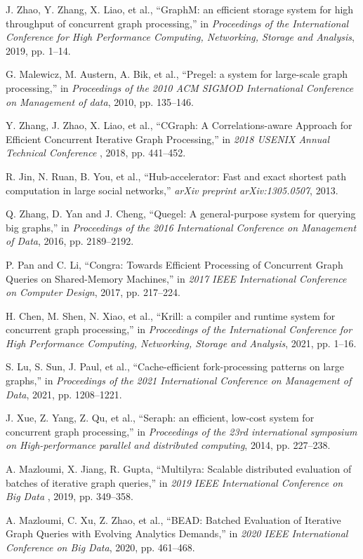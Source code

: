 \documentclass[lettersize,journal]{IEEEtran} %
\begin{document}
\begin{thebibliography}{100}
  J. Zhao, Y. Zhang, X. Liao, et al., ``GraphM: an efficient storage system for high throughput of concurrent graph processing,'' in \textit{Proceedings of the International Conference for High Performance Computing, Networking, Storage and Analysis}, 2019, pp. 1--14.
  
  G. Malewicz, M. Austern, A. Bik, et al., ``Pregel: a system for large-scale graph processing,'' in \textit{Proceedings of the 2010 ACM SIGMOD International Conference on Management of data}, 2010, pp. 135--146.
  
  Y. Zhang, J. Zhao, X. Liao, et al., ``{CGraph}: A Correlations-aware Approach for Efficient Concurrent Iterative Graph Processing,'' in \textit{2018 USENIX Annual Technical Conference }, 2018, pp. 441--452.
  
  R. Jin, N. Ruan, B. You, et al., ``Hub-accelerator: Fast and exact shortest path computation in large social networks,'' \textit{arXiv preprint arXiv:1305.0507}, 2013.
  
  Q. Zhang, D. Yan and J. Cheng, ``Quegel: A general-purpose system for querying big graphs,'' in \textit{Proceedings of the 2016 International Conference on Management of Data}, 2016, pp. 2189--2192.
  
  P. Pan and C. Li, ``Congra: Towards Efficient Processing of Concurrent Graph Queries on Shared-Memory Machines,'' in \textit{2017 IEEE International Conference on Computer Design}, 2017, pp. 217--224.
  
  H. Chen, M. Shen, N. Xiao, et al., ``Krill: a compiler and runtime system for concurrent graph processing,'' in \textit{Proceedings of the International Conference for High Performance Computing, Networking, Storage and Analysis}, 2021, pp. 1--16.
  
  S. Lu, S. Sun, J. Paul, et al., ``Cache-efficient fork-processing patterns on large graphs,'' in \textit{Proceedings of the 2021 International Conference on Management of Data}, 2021, pp. 1208--1221.
  
  J. Xue, Z. Yang, Z. Qu, et al., ``Seraph: an efficient, low-cost system for concurrent graph processing,'' in \textit{Proceedings of the 23rd international symposium on High-performance parallel and distributed computing}, 2014, pp. 227--238.
  
  A. Mazloumi, X. Jiang, R. Gupta, ``Multilyra: Scalable distributed evaluation of batches of iterative graph queries,'' in \textit{2019 IEEE International Conference on Big Data }, 2019, pp. 349--358.
  
  A. Mazloumi, C. Xu, Z. Zhao, et al., ``BEAD: Batched Evaluation of Iterative Graph Queries with Evolving Analytics Demands,'' in \textit{2020 IEEE International Conference on Big Data}, 2020, pp. 461--468.
  
  \end{thebibliography}
\end{document}
